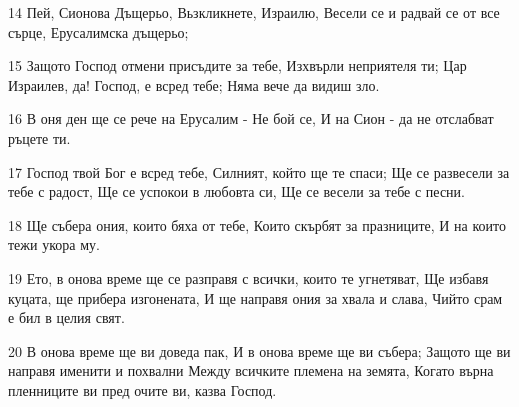 \par 14 Пей, Сионова Дъщерьо, Вьзкликнете, Израилю, Весели се и радвай се от все сърце, Ерусалимска дъщерьо;
\par 15 Защото Господ отмени присъдите за тебе, Изхвърли неприятеля ти; Цар Израилев, да! Господ, е всред тебе; Няма вече да видиш зло.
\par 16 В оня ден ще се рече на Ерусалим - Не бой се, И на Сион - да не отслабват ръцете ти.
\par 17 Господ твой Бог е всред тебе, Силният, който ще те спаси; Ще се развесели за тебе с радост, Ще се успокои в любовта си, Ще се весели за тебе с песни.
\par 18 Ще събера ония, които бяха от тебе, Които скърбят за празниците, И на които тежи укора му.
\par 19 Ето, в онова време ще се разправя с всички, които те угнетяват, Ще избавя куцата, ще прибера изгонената, И ще направя ония за хвала и слава, Чийто срам е бил в целия свят.
\par 20 В онова време ще ви доведа пак, И в онова време ще ви събера; Защото ще ви направя именити и похвални Между всичките племена на земята, Когато върна пленниците ви пред очите ви, казва Господ.

